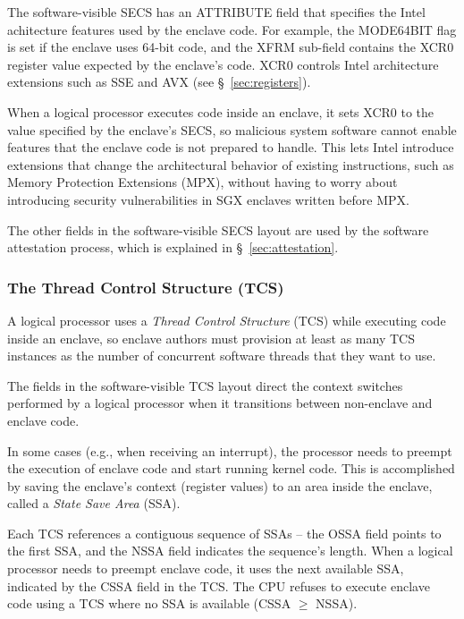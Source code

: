 
The software-visible SECS has an ATTRIBUTE field that specifies the Intel
achitecture features used by the enclave code. For example, the MODE64BIT flag
is set if the enclave uses 64-bit code, and the XFRM sub-field contains the
XCR0 register value expected by the enclave's code. XCR0 controls Intel
architecture extensions such as SSE and AVX (see \S~\ref{sec:registers}).

When a logical processor executes code inside an enclave, it sets XCR0 to the
value specified by the enclave's SECS, so malicious system software cannot
enable features that the enclave code is not prepared to handle. This lets
Intel introduce extensions that change the architectural behavior of existing
instructions, such as Memory Protection Extensions (MPX), without having to
worry about introducing security vulnerabilities in SGX enclaves written before
MPX.

The other fields in the software-visible SECS layout are used by the
software attestation process, which is explained in \S~\ref{sec:attestation}.


\subsubsection{The Thread Control Structure (TCS)}
\label{sec:tcs}


A logical processor uses a \textit{Thread Control Structure} (TCS) while
executing code inside an enclave, so enclave authors must provision at least as
many TCS instances as the number of concurrent software threads that they want
to use.

The fields in the software-visible TCS layout direct the context switches
performed by a logical processor when it transitions between non-enclave and
enclave code.


In some cases (e.g., when receiving an interrupt), the processor needs to
preempt the execution of enclave code and start running kernel code. This is
accomplished by saving the enclave's context (register values) to an area
inside the enclave, called a \textit{State Save Area} (SSA).

Each TCS references a contiguous sequence of SSAs -- the OSSA field points to
the first SSA, and the NSSA field indicates the sequence's length. When a
logical processor needs to preempt enclave code, it uses the next available
SSA, indicated by the CSSA field in the TCS. The CPU refuses to execute enclave
code using a TCS where no SSA is available (CSSA $\ge$ NSSA).


